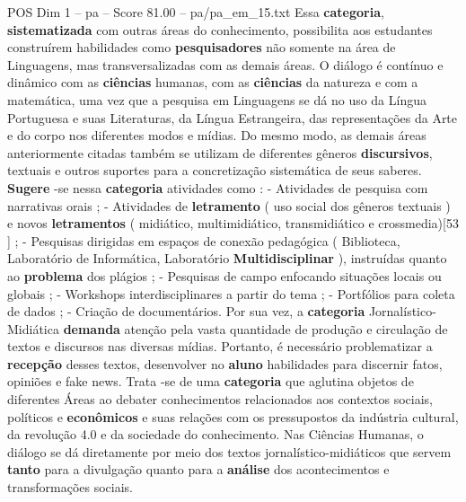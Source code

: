 \begin{textsample}{POS Dim 1 – pa – Score 81.00 – pa/pa\_em\_15.txt}
Essa \textbf{categoria}, \textbf{sistematizada} com outras áreas do conhecimento, possibilita aos estudantes construírem habilidades como \textbf{pesquisadores} não somente na área de Linguagens, mas transversalizadas com as demais áreas.
O diálogo é contínuo e dinâmico com as \textbf{ciências} humanas, com as \textbf{ciências} da natureza e com a matemática, uma vez que a pesquisa em Linguagens se dá no uso da Língua Portuguesa e suas Literaturas, da Língua Estrangeira, das representações da Arte e do corpo nos diferentes modos e mídias.
Do mesmo modo, as demais áreas anteriormente citadas também se utilizam de diferentes gêneros \textbf{discursivos}, textuais e outros suportes para a concretização sistemática de seus saberes. \textbf{Sugere} -se nessa \textbf{categoria} atividades como : - Atividades de pesquisa com narrativas orais ; - Atividades de \textbf{letramento} ( uso social dos gêneros textuais ) e novos \textbf{letramentos} ( midiático, multimidiático, transmidiático e crossmedia)[53 ] ; - Pesquisas dirigidas em espaços de conexão pedagógica ( Biblioteca, Laboratório de Informática, Laboratório \textbf{Multidisciplinar} ), instruídas quanto ao \textbf{problema} dos plágios ; - Pesquisas de campo enfocando situações locais ou globais ; - Workshops interdisciplinares a partir do tema ; - Portfólios para coleta de dados ; - Criação de documentários.
Por sua vez, a \textbf{categoria} Jornalístico-Midiática \textbf{demanda} atenção pela vasta quantidade de produção e circulação de textos e discursos nas diversas mídias.
Portanto, é necessário problematizar a \textbf{recepção} desses textos, desenvolver no \textbf{aluno} habilidades para discernir fatos, opiniões e fake news.
Trata -se de uma \textbf{categoria} que aglutina objetos de diferentes Áreas ao debater conhecimentos relacionados aos contextos sociais, políticos e \textbf{econômicos} e suas relações com os pressupostos da indústria cultural, da revolução 4.0 e da sociedade do conhecimento.
Nas Ciências Humanas, o diálogo se dá diretamente por meio dos textos jornalístico-midiáticos que servem \textbf{tanto} para a divulgação quanto para a \textbf{análise} dos acontecimentos e transformações sociais.

\end{textsample}

